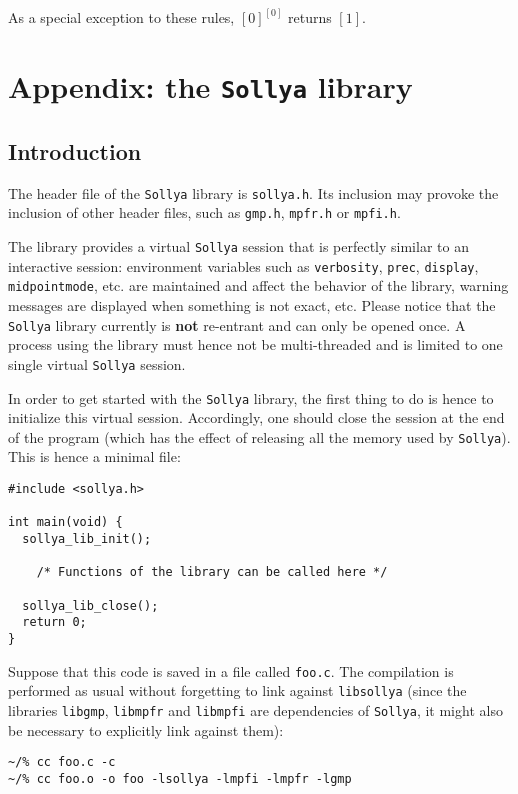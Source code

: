 \documentclass[a4paper]{article}
\newcommand{\sollya}{\texttt{Sollya}\xspace}
\begin{document}
As a special exception to these rules, $[0]^{[0]}$ returns $[1]$.

\newpage
\section{Appendix: the \sollya library}
\label{Libsollya}
 \subsection{Introduction}
The header file of the \sollya library is \texttt{sollya.h}. Its inclusion may provoke the inclusion of other header files, such as \texttt{gmp.h}, \texttt{mpfr.h} or \texttt{mpfi.h}.

The library provides a virtual \sollya session that is perfectly similar to an interactive session: environment variables such as \texttt{verbosity}, \texttt{prec}, \texttt{display}, \texttt{midpointmode}, etc. are maintained and affect the behavior of the library, warning messages are displayed when something is not exact, etc. Please notice that the \sollya library currently is \textbf{not} re-entrant and can only be opened once. A process using the library must hence not be multi-threaded and is limited to one single virtual \sollya session.

In order to get started with the \sollya library, the first thing to do is hence to initialize this virtual session. Accordingly, one should close the session at the end of the program (which has the effect of releasing all the memory used by \sollya). This is hence a minimal file:

\begin{center}\begin{minipage}{15cm}\begin{Verbatim}[frame=single]
#include <sollya.h>

int main(void) {
  sollya_lib_init();

    /* Functions of the library can be called here */

  sollya_lib_close();
  return 0;
}
\end{Verbatim}
\end{minipage}\end{center}

Suppose that this code is saved in a file called \texttt{foo.c}. The compilation is performed as usual without forgetting to link against \texttt{libsollya} (since the libraries \texttt{libgmp}, \texttt{libmpfr} and \texttt{libmpfi} are dependencies of \sollya, it might also be necessary to explicitly link against them):
\begin{center}\begin{minipage}{15cm}\begin{Verbatim}[frame=single]
~/% cc foo.c -c
~/% cc foo.o -o foo -lsollya -lmpfi -lmpfr -lgmp
\end{Verbatim}
\end{minipage}\end{center}
\end{document}
